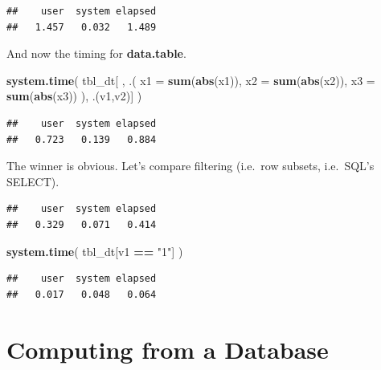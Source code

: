 \documentclass[]{book}
\newenvironment{Shaded}{\begin{snugshade}}{\end{snugshade}}
\newcommand{\KeywordTok}[1]{\textcolor[rgb]{0.13,0.29,0.53}{\textbf{#1}}}
\newcommand{\DataTypeTok}[1]{\textcolor[rgb]{0.13,0.29,0.53}{#1}}
\newcommand{\StringTok}[1]{\textcolor[rgb]{0.31,0.60,0.02}{#1}}
\newcommand{\OperatorTok}[1]{\textcolor[rgb]{0.81,0.36,0.00}{\textbf{#1}}}
\newcommand{\NormalTok}[1]{#1}
\theoremstyle{definition}
\theoremstyle{definition}
\theoremstyle{definition}
\theoremstyle{remark}
\begin{document}
\begin{verbatim}
##    user  system elapsed 
##   1.457   0.032   1.489
\end{verbatim}

And now the timing for \textbf{data.table}.

\begin{Shaded}
\begin{Highlighting}[]
\KeywordTok{system.time}\NormalTok{( }
\NormalTok{  tbl_dt[ ,  .( }\DataTypeTok{x1 =} \KeywordTok{sum}\NormalTok{(}\KeywordTok{abs}\NormalTok{(x1)), }\DataTypeTok{x2 =} \KeywordTok{sum}\NormalTok{(}\KeywordTok{abs}\NormalTok{(x2)), }\DataTypeTok{x3 =} \KeywordTok{sum}\NormalTok{(}\KeywordTok{abs}\NormalTok{(x3)) ), .(v1,v2)]}
\NormalTok{  )}
\end{Highlighting}
\end{Shaded}

\begin{verbatim}
##    user  system elapsed 
##   0.723   0.139   0.884
\end{verbatim}

The winner is obvious. Let's compare filtering (i.e.~row subsets,
i.e.~SQL's SELECT).

\begin{Shaded}
\end{Shaded}

\begin{verbatim}
##    user  system elapsed 
##   0.329   0.071   0.414
\end{verbatim}

\begin{Shaded}
\begin{Highlighting}[]
\KeywordTok{system.time}\NormalTok{( }
\NormalTok{  tbl_dt[v1 }\OperatorTok{==}\StringTok{ "1"}\NormalTok{] }
\NormalTok{  )}
\end{Highlighting}
\end{Shaded}

\begin{verbatim}
##    user  system elapsed 
##   0.017   0.048   0.064
\end{verbatim}

\section{Computing from a Database}\label{computing-from-a-database}
\end{document}
